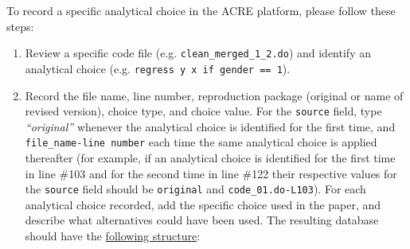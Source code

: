 \documentclass[]{book}
\begin{document}
To record a specific analytical choice in the ACRE platform, please follow these steps:

\begin{enumerate}
\def\labelenumi{\arabic{enumi}.}
\item
  Review a specific code file (e.g. \texttt{clean\_merged\_1\_2.do}) and identify an analytical choice (e.g. \texttt{regress\ y\ x\ if\ gender\ ==\ 1}).
\item
  Record the file name, line number, reproduction package (original or name of revised version), choice type, and choice value. For the \texttt{source} field, type \emph{``original''} whenever the analytical choice is identified for the first time, and \texttt{file\_name-line\ number} each time the same analytical choice is applied thereafter (for example, if an analytical choice is identified for the first time in line \#103 and for the second time in line \#122 their respective values for the \texttt{source} field should be \texttt{original} and \texttt{code\_01.do-L103}). For each analytical choice recorded, add the specific choice used in the paper, and describe what alternatives could have been used. The resulting database should have the \href{https://docs.google.com/spreadsheets/d/1nZuJSHswbZgaaIfBcyIUGPwG-WIP8zE1Oambud-WoDc/edit?usp=sharing}{following structure}:
\end{enumerate}
\end{document}
